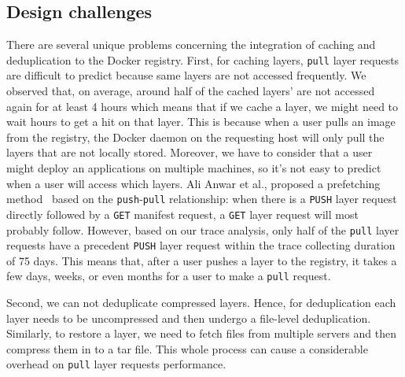 \subsection{Design challenges}
There are several unique problems concerning the integration
of caching and deduplication to the Docker registry.
%
First, for caching layers, \texttt{pull} layer requests are difficult to
predict because same layers are not accessed frequently.
We observed that, on average, around half of the cached layers' are not
accessed again for at least 4 hours which means that if we
cache a layer, we might need to wait hours to get a hit on that layer.  
This is
because when a user pulls an image from the registry, the Docker daemon on the
requesting host will only pull the layers that are not locally stored.
Moreover, we have to consider that a user might deploy an applications on
multiple machines, so it's not easy to predict when a user will access which layers. 
Ali Anwar et
al., proposed a prefetching method~\cite{dockerworkload} based on the
\texttt{push}-\texttt{pull} relationship: when there is a \texttt{PUSH} layer
request directly followed by a \texttt{GET} manifest request, a \texttt{GET}
layer request will most probably follow. 
However, based on our trace analysis,
only half of the \texttt{pull} layer
requests have a precedent \texttt{PUSH} layer request within the trace
collecting duration of 75 days. This means that, after a user pushes a layer
to the registry, it takes a few days, weeks, or even months for a user to make
a \texttt{pull} request.

Second, we can not deduplicate compressed layers. Hence, for deduplication each layer
needs to be uncompressed and then undergo a file-level deduplication. Similarly,
to restore a layer, we need to fetch files from multiple servers and then compress
them in to a tar file. 
This whole process can cause a 
considerable overhead on \texttt{pull} layer requests performance.


